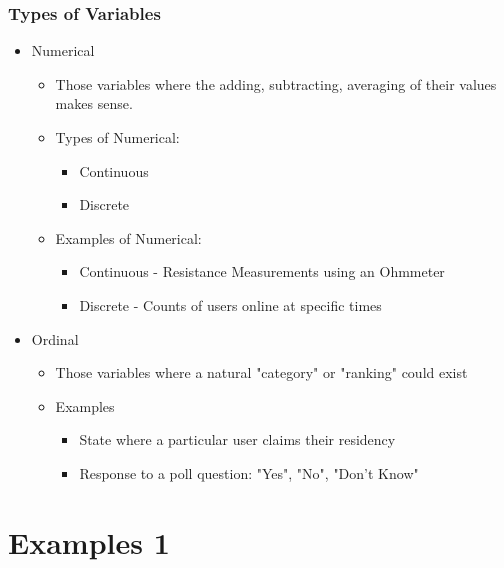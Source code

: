 \documentclass[mathserif]{beamer}
\begin{document}
\begin{frame}[t]
\frametitle{Types of Variables}

\begin{itemize}
	\item{Numerical}
	\begin{itemize}
		\item{Those variables where the adding, subtracting, averaging of their values makes sense.}
		\item{Types of Numerical:}
		\begin{itemize}
			\item{Continuous}
			\item{Discrete}
		\end{itemize}
		\item{Examples of Numerical:}
		\begin{itemize}
			\item{Continuous - Resistance Measurements using an Ohmmeter}
			\item{Discrete - Counts of users online at specific times}
		\end{itemize}		
	\end{itemize}
	\item{Ordinal}
	\begin{itemize}
		\item{Those variables where a natural "category" or "ranking" could exist}
		\item{Examples}
		\begin{itemize}
			\item{State where a particular user claims their residency}
			\item{Response to a poll question: "Yes", "No", "Don't Know"}
		\end{itemize}
	\end{itemize}
\end{itemize}
\end{frame}

\section{Examples 1}
\end{document}
